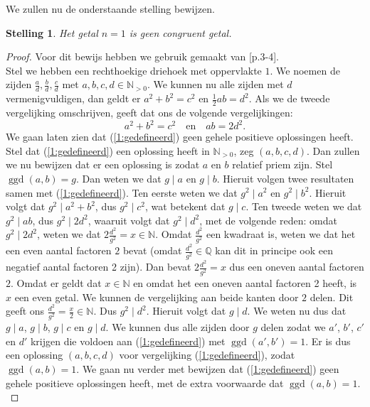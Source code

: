 \documentclass[12pt,reqno]{article}
\newcommand*{\NN}{\ensuremath{\mathbb{N}}}
\newcommand*{\QQ}{\ensuremath{\mathbb{Q}}}
\newcommand*{\NO}{\ensuremath{\mathbb{N}_{>0}}}
\theoremstyle{theorem}
\newtheorem{theorem}{Stelling}
\theoremstyle{definition}
\DeclareMathOperator{\ggd}{ggd}
\begin{document}
	We zullen nu de onderstaande stelling bewijzen.
	\begin{theorem}
		Het getal $n=1$ is geen congruent getal.
	\end{theorem}
	\begin{proof}
		Voor dit bewijs hebben we gebruik gemaakt van \cite{Conrad}[p.3-4].\\
		Stel we hebben een rechthoekige driehoek met oppervlakte $1$. We noemen de zijden $\frac{a}{d}, \frac{b}{d}, \frac{c}{d}$ met $a,b,c,d\in\NO$. We kunnen nu alle zijden met $d$ vermenigvuldigen, dan geldt er $a^2 + b^2 = c ^2$ en $\frac{1}{2}ab = d^2$. Als we de tweede vergelijking omschrijven, geeft dat ons de volgende vergelijkingen:
		\begin{equation}\label{1:gedefineerd}
			a^2 + b^2 = c^2 \quad \text{en} \quad ab = 2d^2.
		\end{equation}
		We gaan laten zien dat (\ref{1:gedefineerd}) geen gehele positieve oplossingen heeft.\\
								
		Stel dat (\ref{1:gedefineerd}) een oplossing heeft in $\NO$, zeg $(a, b, c, d)$. Dan zullen we nu bewijzen dat er een oplossing is zodat $a$ en $b$ relatief priem zijn. Stel $\ggd(a,b) = g$. Dan weten we dat $g \mid a$ en $g \mid b$. Hieruit volgen twee resultaten samen met (\ref{1:gedefineerd}). Ten eerste weten we dat $g^2 \mid a^2$ en $g^2 \mid b^2$. Hieruit volgt dat $g^2 \mid a^2 + b^2$, dus $g^2 \mid c^2$, wat betekent dat $g \mid c$. Ten tweede weten we dat $g^2 \mid ab$, dus $g^2 \mid 2d^2$, waaruit volgt dat $g^2 \mid d^2$, met de volgende reden: omdat $g^2 \mid 2d^2$, weten we dat $2\frac{d^2}{g^2} = x \in\NN$. Omdat $\frac{d^2}{g^2}$ een kwadraat is, weten we dat het een even aantal factoren $2$ bevat (omdat $\frac{d^2}{g^2}\in\QQ$ kan dit in principe ook een negatief aantal factoren 2 zijn). Dan bevat $2\frac{d^2}{g^2} = x$ dus een oneven aantal factoren $2$. Omdat er geldt dat $x \in\NN$ en omdat het een oneven aantal factoren 2 heeft, is $x$ een even getal. We kunnen de vergelijking aan beide kanten door $2$ delen. Dit geeft ons $\frac{d^2}{g^2}=\frac{x}{2} \in\NN$. Dus $g^2 \mid d^2$. Hieruit volgt dat $g \mid d$. We weten nu dus dat $g \mid a$, $g \mid b$, $g \mid c$ en $g \mid d$. We kunnen dus alle zijden door $g$ delen zodat we $a'$, $b'$, $c'$ en $d'$ krijgen die voldoen aan (\ref{1:gedefineerd}) met $\ggd(a',b') = 1$. Er is dus een oplossing $(a,b,c,d)$ voor vergelijking (\ref{1:gedefineerd}), zodat $\ggd(a,b)=1$. We gaan nu verder met bewijzen dat (\ref{1:gedefineerd}) geen gehele positieve oplossingen heeft, met de extra voorwaarde dat $\ggd(a,b) = 1$.\\
								

\end{proof}
\end{document}
